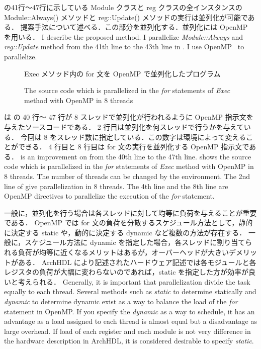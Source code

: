  の41行〜47行に示している Module クラスと reg クラスの全インスタンスの Module::Always() メソッドと reg::Update() メソッドの実行は並列化が可能である．
提案手法について述べる．この部分を並列化する．並列化には OpenMP~\cite{openmp} を用いる．
\fi
I describe the proposed method.
I parallelize \textit{Module::Always} and \textit{reg::Update} method from the 41th line to the 43th line in .
I use OpenMP~\cite{openmp} to parallelize.

\begin{figure}[t]
 
 \caption{Exec メソッド内の for 文を OpenMP で並列化したプログラム}
\fi
 \caption{The source code which is parallelized in the \textit{for} statements of \textit{Exec} method with OpenMP in 8 threads}
 \label{src:exec_openmp}
\end{figure}

 は の 40 行〜 47 行が 8 スレッドで並列化が行われるように OpenMP 指示文を与えたソースコードである．
2 行目は並列化を何スレッドで行うかを与えている．
今回は 8 をスレッド数に指定している．この数字は環境によって変えることができる．
4 行目と 8 行目は for 文の実行を並列化する OpenMP 指示文である．
\fi
{} is an improvement on  from the 40th line to the 47th line.
 shows the source code which is parallelized in the \textit{for} statements of \textit{Exec} method with OpenMP in 8 threads.
The number of threads can be changed by the environment.
The 2nd line of  give parallelization in 8 threads.
The 4th line and the 8th line are OpenMP directives to parallelize the execution of the \textit{for} statement.

一般に，並列化を行う場合は各スレッドに対して均等に負荷を与えることが重要である．
OpenMP では for 文の負荷を分散するスケジュール方法として，静的に決定する static や，動的に決定する dynamic など複数の方法が存在する．
一般に，スケジュール方法に dynamic を指定した場合，各スレッドに割り当てられる負荷が均等に近くなるメリットはあるが，オーバーヘッドが大きいデメリットがある．
ArchHDL により記述されたハードウェア記述では各モジュールと各レジスタの負荷が大幅に変わらないのであれば，static を指定した方が効率が良いと考えられる．
\fi
Generally, it is important that parallelization divide the task equally to each thread.
Several methods such as \textit{static} to determine statically
and \textit{dynamic} to determine dynamic exist
as a way to balance the load of the \textit{for} statement in OpenMP.
If you specify the \textit{dynamic} as a way to schedule,
it has an advantage as a load assigned to each thread is almost equal
but a disadvantage as large overhead.
If load of each register and each module is not very difference in the hardware description in ArchHDL,
it is considered desirable to specify \textit{static}.

